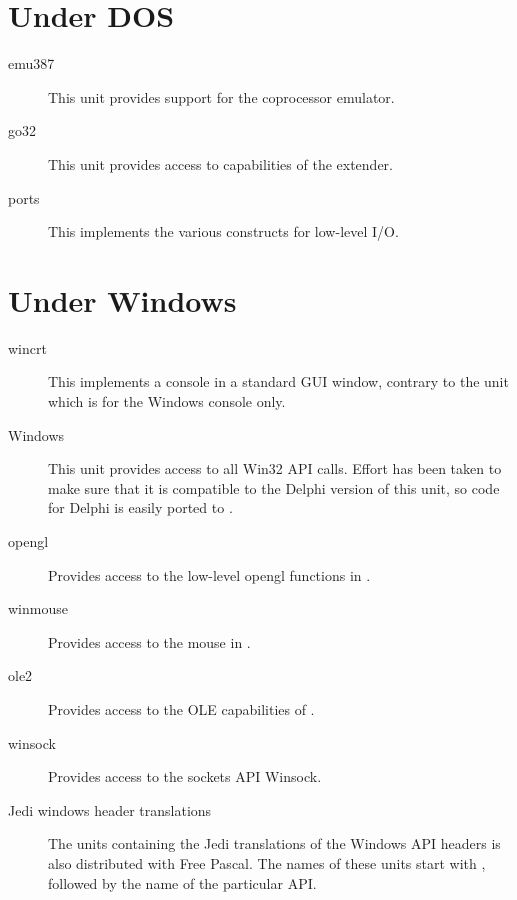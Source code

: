 %
%
\section{Under DOS}
\begin{description}
\item [emu387] This unit provides support for the coprocessor emulator.
\item [go32] This unit provides access to capabilities of the 
\dos extender.
\item[ports] This implements the various  constructs for low-level
I/O.
\end{description}

%
%
\section{Under Windows}
\begin{description}
\item[wincrt] This implements a console in a standard GUI window, contrary
to the  unit which is for the Windows console only.
\item[Windows] This unit provides access to all Win32 API calls. Effort has
been taken to make sure that it is compatible to the Delphi version of this
unit, so code for Delphi is easily ported to \fpc.
\item[opengl] Provides access to the low-level opengl functions in \windows.
\item[winmouse] Provides access to the mouse in \windows.
\item[ole2] Provides access to the OLE capabilities of \windows.
\item[winsock] Provides access to the \windows sockets API Winsock.
\item[Jedi windows header translations] The units containing the Jedi
translations of the Windows API headers is also distributed with Free
Pascal. The names of these units start with , followed by the
name of the particular API.
\end{description}

%
%
